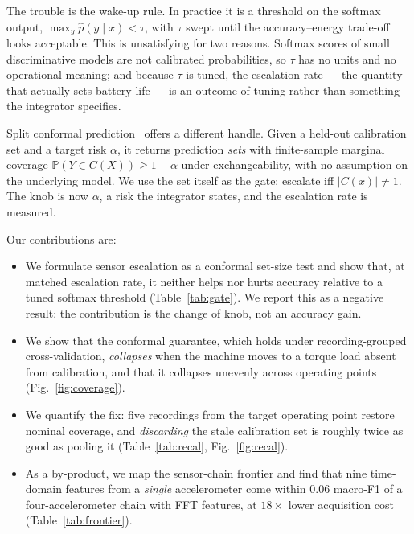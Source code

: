 \documentclass{article}
\begin{document}
The trouble is the wake-up rule. In practice it is a threshold on the
softmax output, $\max_y \hat p(y \mid x) < \tau$, with $\tau$ swept until
the accuracy--energy trade-off looks acceptable. This is unsatisfying for
two reasons. Softmax scores of small discriminative models are not
calibrated probabilities, so $\tau$ has no units and no operational
meaning; and because $\tau$ is tuned, the escalation rate --- the quantity
that actually sets battery life --- is an outcome of tuning rather than
something the integrator specifies.

Split conformal prediction~\cite{papadopoulos2002,vovk2005,lei2018,angelopoulos2023}
offers a different handle. Given a held-out calibration set and a target
risk $\alpha$, it returns prediction \emph{sets} with finite-sample
marginal coverage $\mathbb{P}(Y \in C(X)) \geq 1-\alpha$ under
exchangeability, with no assumption on the underlying model. We use the
set itself as the gate: escalate iff $|C(x)| \neq 1$. The knob is now
$\alpha$, a risk the integrator states, and the escalation rate is
measured.

Our contributions are:
\begin{itemize}\itemsep1pt
\item We formulate sensor escalation as a conformal set-size test and show
      that, at matched escalation rate, it neither helps nor hurts accuracy
      relative to a tuned softmax threshold (Table~\ref{tab:gate}). We
      report this as a negative result: the contribution is the change of
      knob, not an accuracy gain.
\item We show that the conformal guarantee, which holds under
      recording-grouped cross-validation, \emph{collapses} when the machine
      moves to a torque load absent from calibration, and that it collapses
      unevenly across operating points (Fig.~\ref{fig:coverage}).
\item We quantify the fix: five recordings from the target operating point
      restore nominal coverage, and \emph{discarding} the stale calibration
      set is roughly twice as good as pooling it
      (Table~\ref{tab:recal}, Fig.~\ref{fig:recal}).
\item As a by-product, we map the sensor-chain frontier and find that nine
      time-domain features from a \emph{single} accelerometer come within
      $0.06$ macro-F1 of a four-accelerometer chain with FFT features, at
      $18\times$ lower acquisition cost (Table~\ref{tab:frontier}).
\end{itemize}
\end{document}
